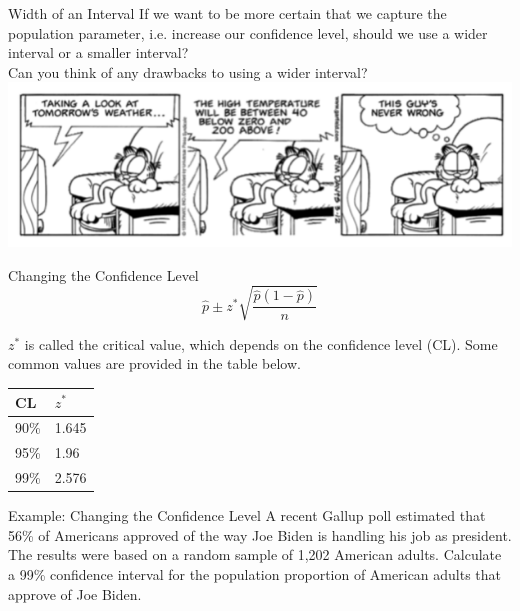 \documentclass[11pt]{beamer}
\begin{document}
\begin{frame}{Width of an Interval}
\vspace{-1cm}
If we want to be more certain that we capture the population parameter, i.e. increase our confidence level, should we use a wider interval or a smaller interval?\\
\vspace{1cm}
Can you think of any drawbacks to using a wider interval?\\
\includegraphics[scale=0.35]{figure/garfield.png}
\end{frame}

\begin{frame}{Changing the Confidence Level}
$$\hat{p} \pm z^* \sqrt{\frac{\hat{p}(1-\hat{p})}{n}}$$
\vspace{10pt}

$z^*$ is called the critical value, which depends on the confidence level (CL).  Some common values are provided in the table below.\\

\vspace{5pt}

\begin{table}[ht]
\begin{tabular}{l|l}
\hline
CL & $z^*$\\
\hline
90\% & 1.645\\
95\% & 1.96\\
99\% &  2.576\\
\hline
\end{tabular}
\end{table}
\end{frame}



\begin{frame}{Example: Changing the Confidence Level}
\vspace{-3.5cm}
\small
A recent Gallup poll estimated that 56\% of Americans approved of the way Joe Biden is handling his job as president.  The results were based on a random sample of 1,202 American adults.  Calculate a 99\% confidence interval for the population proportion of American adults that approve of Joe Biden.\\
\end{frame}
\end{document}
